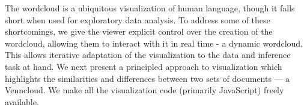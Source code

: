 The wordcloud is a ubiquitous visualization of human language, though it falls short when used for exploratory data analysis. To address some of these shortcomings, we give the viewer explicit control over the creation of the wordcloud, allowing them to interact with it in real time -  a dynamic wordcloud. This allows iterative adaptation of the visualization to the data and inference task at hand. We next present a principled approach to visualization which highlights the similarities and differences between two sets of documents --- a Venncloud. We make all the visualization code (primarily JavaScript) freely available.
